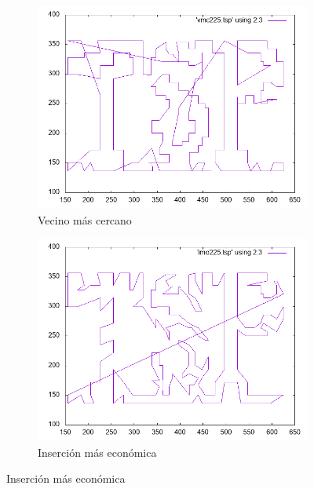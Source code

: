\documentclass[12pt,spanish]{article}
\begin{document}
\begin{figure}[H]
\centering
\begin{subfigure}[b]{0.36\textwidth}
\includegraphics[width=\textwidth]{tsp225_vmc.png}
\caption{Vecino más cercano}
\end{subfigure}
\quad
\begin{subfigure}[b]{0.36\textwidth}
\includegraphics[width=\textwidth]{tsp225_ime.png}
\caption{Inserción más económica}
\end{subfigure}

\vspace{1cm}


\end{figure}
\end{document}
